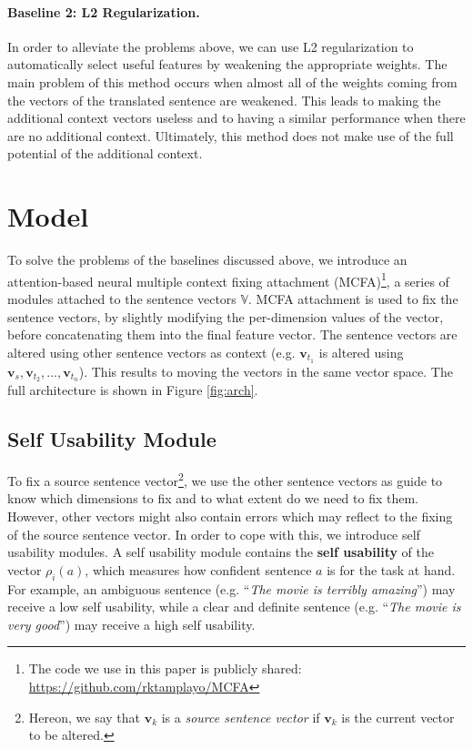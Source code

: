 \documentclass{article}
\begin{document}
\paragraph{Baseline 2: L2 Regularization.}

In order to alleviate the problems above, we can use L2 regularization to automatically select useful features by weakening the appropriate weights. The main problem of this method occurs when almost all of the weights coming from the vectors of the translated sentence are weakened. This leads to making the additional context vectors useless and to having a similar performance when there are no additional context. Ultimately, this method does not make use of the full potential of the additional context.

\section{Model}

To solve the problems of the baselines discussed above, we introduce an attention-based neural multiple context fixing attachment (MCFA)\footnote{The code we use in this paper is publicly shared: \url{https://github.com/rktamplayo/MCFA}}, a series of modules attached to the sentence vectors $\mathbb{V}$. MCFA attachment is used to fix the sentence vectors, by slightly modifying the per-dimension values of the vector, before concatenating them into the final feature vector. The sentence vectors are altered using other sentence vectors as context (e.g. $\mathbf{v}_{t_1}$ is altered using $\mathbf{v}_s, \mathbf{v}_{t_2}, ..., \mathbf{v}_{t_n}$). This results to moving the vectors in the same vector space.
The full architecture is 
shown in Figure \ref{fig:arch}.


\subsection{Self Usability Module}

To fix a source sentence vector\footnote{Hereon, we say that $\mathbf{v}_k$ is a \textit{source sentence vector} if $\mathbf{v}_k$ is the current vector to be altered.}, we use the other sentence vectors as guide to know which dimensions to fix and to what extent do we need to fix them. However, other vectors might also contain errors which may reflect to the fixing of the source sentence vector. In order to cope with this, we introduce self usability modules. A self usability module contains the \textbf{self usability} of the vector
$\rho_i(a)$, which measures how confident sentence $a$ is for the task at hand. For example, an ambiguous sentence (e.g. ``\textit{The movie is terribly amazing}'') may receive a low self usability, while a clear
and definite 
sentence (e.g. ``\textit{The movie is very good}'') may receive a high self usability.
\end{document}
